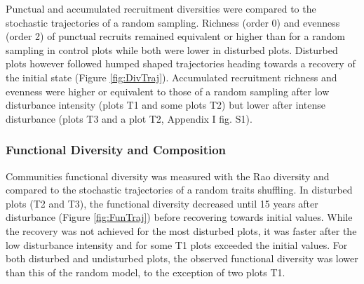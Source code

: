 \documentclass[fleqn,10pt]{ArtEcoFoG} %
\begin{document}
Punctual and accumulated recruitment diversities were compared to the
stochastic trajectories of a random sampling. Richness (order 0) and
evenness (order 2) of punctual recruits remained equivalent or higher
than for a random sampling in control plots while both were lower in
disturbed plots. Disturbed plots however followed humped shaped
trajectories heading towards a recovery of the initial state (Figure
\ref{fig:DivTraj}). Accumulated recruitment richness and evenness were
higher or equivalent to those of a random sampling after low disturbance
intensity (plots T1 and some plots T2) but lower after intense
disturbance (plots T3 and a plot T2, Appendix I fig. S1).

\subsubsection{Functional Diversity and
Composition}\label{functional-diversity-and-composition}

Communities functional diversity was measured with the Rao diversity and
compared to the stochastic trajectories of a random traits shuffling. In
disturbed plots (T2 and T3), the functional diversity decreased until 15
years after disturbance (Figure \ref{fig:FunTraj}) before recovering
towards initial values. While the recovery was not achieved for the most
disturbed plots, it was faster after the low disturbance intensity and
for some T1 plots exceeded the initial values. For both disturbed and
undisturbed plots, the observed functional diversity was lower than this
of the random model, to the exception of two plots T1.
\end{document}
